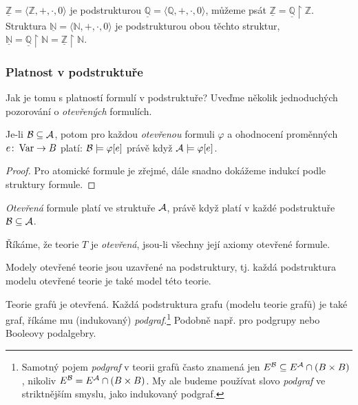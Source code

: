 \begin{example}
    $\underline{\mathbb Z}=\langle\mathbb Z,+,\cdot,0\rangle$ je podstrukturou $\underline{\mathbb Q}=\langle\mathbb Q,+,\cdot,0\rangle$, můžeme psát $\underline{\mathbb Z}=\underline{\mathbb Q}\restriction\mathbb Z$. Struktura $\underline{\mathbb N}=\langle \mathbb N,+,\cdot,0\rangle$ je podstrukturou obou těchto struktur, $\underline{\mathbb N}=\underline{\mathbb Q}\restriction\mathbb N=\underline{\mathbb Z}\restriction\mathbb N$.
\end{example}

\subsubsection{Platnost v podstruktuře}

Jak je tomu s platností formulí v podstruktuře? Uveďme několik jednoduchých pozorování o \emph{otevřených} formulích.

\begin{observation}
    Je-li $\mathcal{B}\subseteq\mathcal{A}$, potom pro každou \emph{otevřenou} formuli $\varphi$ a ohodnocení proměnných $e\colon\operatorname{Var}\to B$ platí: $\mathcal{B}\models\varphi[e]$ právě když $\mathcal{A}\models\varphi[e]$.
\end{observation}
\begin{proof}
    Pro atomické formule je zřejmé, dále snadno dokážeme indukcí podle struktury formule.
\end{proof}

\begin{corollary}
    \emph{Otevřená} formule platí ve struktuře $\mathcal{A}$, právě když platí v každé podstruktuře $\mathcal{B}\subseteq\mathcal{A}$.
\end{corollary}

Říkáme, že teorie $T$ je \emph{otevřená}, jsou-li všechny její axiomy otevřené formule.

\begin{corollary}
    Modely otevřené teorie jsou uzavřené na podstruktury, tj. každá podstruktura modelu otevřené teorie je také model této teorie.
\end{corollary}

\begin{example}
    Teorie grafů je otevřená. Každá podstruktura grafu (modelu teorie grafů) je také graf, říkáme mu (indukovaný) \emph{podgraf}.\footnote{Samotný pojem \emph{podgraf} v teorii grafů často znamená jen $E^{\mathcal{B}}\subseteq E^{\mathcal{A}}\cap (B\times B)$, nikoliv $E^{\mathcal{B}}=E^{\mathcal{A}}\cap (B\times B)$. My ale budeme používat slovo \emph{podgraf} ve striktnějším smyslu, jako indukovaný podgraf.} Podobně např. pro podgrupy nebo Booleovy podalgebry.
\end{example}


